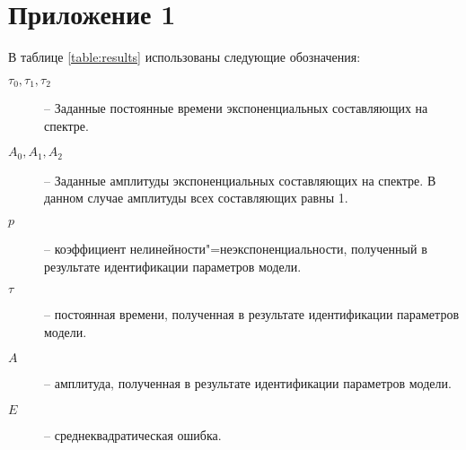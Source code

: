 \section*{Приложение 1}
	
    В таблице \ref{table:results} использованы следующие обозначения:
    \begin{description}
    	\item[$\tau_0, \tau_1, \tau_2$] -- Заданные постоянные времени
    	экспоненциальных составляющих на спектре.
    	\item[$A_0, A_1, A_2$] -- Заданные амплитуды экспоненциальных составляющих на спектре. В данном случае амплитуды всех
    	составляющих равны 1.
    	\item[$p$] -- коэффициент нелинейности"=неэкспоненциальности,
    	полученный в результате идентификации параметров модели.
    	\item[$\tau$] -- постоянная времени, полученная в результате
    	идентификации параметров модели.
    	\item[$A$] -- амплитуда, полученная в результате идентификации
    	параметров модели.
    	\item[$E$] -- среднеквадратическая ошибка.
    \end{description}